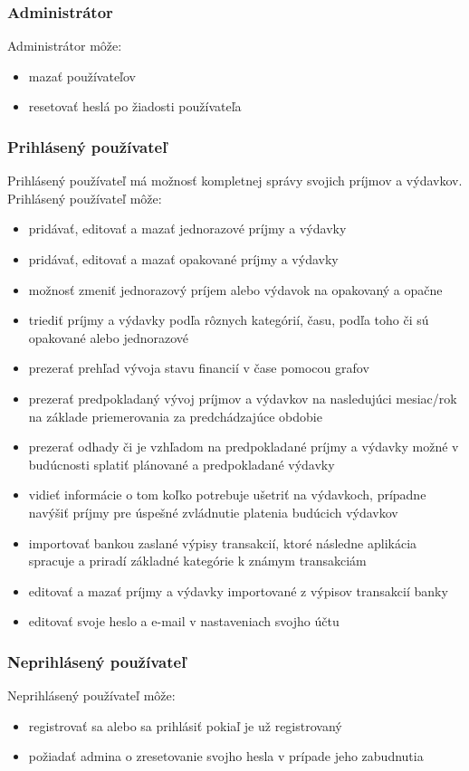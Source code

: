 \documentclass[12pt,onesided]{book}
\begin{document}
\subsubsection{Administrátor}
Administrátor môže:
\begin{itemize}
\item{mazať používateľov}
\item{resetovať heslá po žiadosti používateľa}
\end{itemize}

\subsubsection{Prihlásený používateľ}
Prihlásený používateľ má možnosť kompletnej správy svojich príjmov a výdavkov.
Prihlásený používateľ môže:
\begin{itemize}
\item{pridávať, editovať a mazať jednorazové príjmy a výdavky}
\item{pridávať, editovať a mazať opakované príjmy a výdavky}
\item{možnosť zmeniť jednorazový príjem alebo výdavok na opakovaný a opačne}
\item{triediť príjmy a výdavky podľa rôznych kategórií, času, podľa toho či sú opakované alebo jednorazové}
\item{prezerať prehľad vývoja stavu financií v čase pomocou grafov}
\item{prezerať  predpokladaný vývoj príjmov a výdavkov na nasledujúci mesiac/rok na základe priemerovania za predchádzajúce obdobie}
\item{prezerať odhady či je vzhľadom na predpokladané príjmy a výdavky možné v budúcnosti splatiť plánované a predpokladané výdavky}
\item{vidieť informácie o tom koľko potrebuje ušetriť na výdavkoch, prípadne navýšiť príjmy pre úspešné zvládnutie platenia budúcich výdavkov}
\item{importovať bankou zaslané výpisy transakcií, ktoré následne aplikácia spracuje a priradí základné kategórie k známym transakciám}
\item{editovať a mazať príjmy a výdavky importované z výpisov transakcií banky}
\item{editovať svoje heslo a e-mail v nastaveniach svojho účtu}
\end{itemize}

\subsubsection{Neprihlásený používateľ}
Neprihlásený používateľ môže:
\begin{itemize}
\item{registrovať sa alebo sa prihlásiť pokiaľ je už registrovaný}
\item{požiadať admina o zresetovanie svojho hesla v prípade jeho zabudnutia}
\end{itemize}
\end{document}
